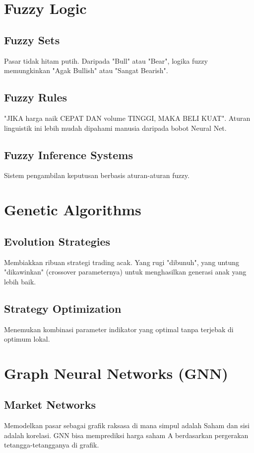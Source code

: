 \documentclass[12pt,a4paper]{book}
\begin{document}
\section{Fuzzy Logic}
\subsection{Fuzzy Sets}
Pasar tidak hitam putih. Daripada "Bull" atau "Bear", logika fuzzy memungkinkan "Agak Bullish" atau "Sangat Bearish".

\subsection{Fuzzy Rules}
"JIKA harga naik CEPAT DAN volume TINGGI, MAKA BELI KUAT". Aturan linguistik ini lebih mudah dipahami manusia daripada bobot Neural Net.

\subsection{Fuzzy Inference Systems}
Sistem pengambilan keputusan berbasis aturan-aturan fuzzy.

\section{Genetic Algorithms}
\subsection{Evolution Strategies}
Membiakkan ribuan strategi trading acak. Yang rugi "dibunuh", yang untung "dikawinkan" (crossover parameternya) untuk menghasilkan generasi anak yang lebih baik.

\subsection{Strategy Optimization}
Menemukan kombinasi parameter indikator yang optimal tanpa terjebak di optimum lokal.

\section{Graph Neural Networks (GNN)}
\subsection{Market Networks}
Memodelkan pasar sebagai grafik raksasa di mana simpul adalah Saham dan sisi adalah korelasi. GNN bisa memprediksi harga saham A berdasarkan pergerakan tetangga-tetangganya di grafik.
\end{document}
